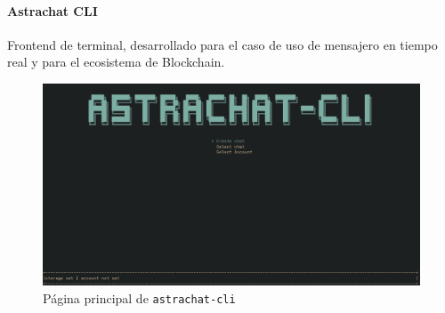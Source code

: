 
\paragraph{Astrachat CLI}

Frontend de terminal, desarrollado para el caso de uso de mensajero en tiempo real y para el ecosistema de Blockchain.

\begin{figure}[H]
    \centering
    \includegraphics[width=1\linewidth]{img/astrachat-cli-main-page.png}
    \caption{Página principal de \texttt{astrachat-cli}}
    \label{fig:astrachat-cli-main-page}
\end{figure}